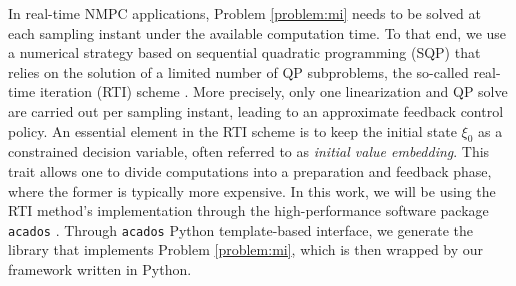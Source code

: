 In real-time NMPC applications, Problem \ref{problem:mi} needs to be solved at each sampling instant under the available computation time. To that end, we use a numerical strategy based on sequential quadratic programming (SQP) that relies on the solution of a limited number of QP subproblems, the so-called real-time iteration (RTI) scheme \cite{diehl2005}. More precisely, only one linearization and QP solve are carried out per sampling instant, leading to an approximate feedback control policy. An essential element in the RTI scheme is to keep the initial state $\xi_0$ as a constrained decision variable, often referred to as \emph{initial value embedding}. This trait allows one to divide computations into a preparation and feedback phase, where the former is typically more expensive. In this work, we will be using the RTI method's implementation through the high-performance software package \texttt{acados} \cite{verschueren2019}. Through \texttt{acados} Python template-based interface, we generate the library that implements Problem \ref{problem:mi}, which is then wrapped by our framework written in Python. 